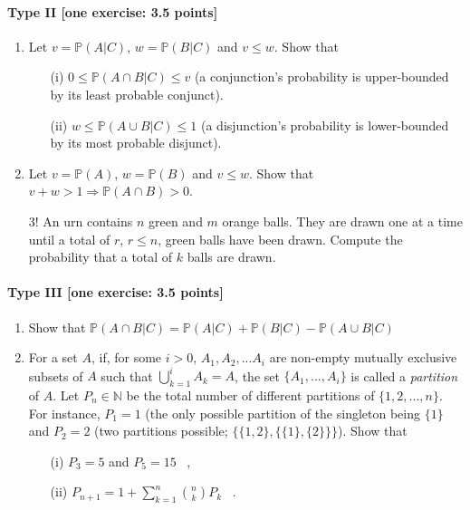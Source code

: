 \documentclass{article}
\begin{document}
\paragraph{Type II [one exercise: 3.5 points]}
\begin{enumerate}
	\item Let $v = \mathbb{P}(A|C)$, $w = \mathbb{P}(B|C)$ and $v \leq w$. Show that 
	\begin{itemize}
		\item [(i)] $0 \leq \mathbb{P}(A \cap B|C) \leq v$ (a conjunction's probability is upper-bounded by its least probable conjunct).	 \item[(ii)] $w \leq \mathbb{P}(A \cup B|C) \leq 1$ (a disjunction's probability is lower-bounded by its most probable disjunct).
	\end{itemize}
\item Let $v = \mathbb{P}(A)$, $w = \mathbb{P}(B)$ and $v \leq w$. Show that $v + w > 1 \Rightarrow \mathbb{P}(A \cap B) > 0$.
\item[3!] An urn contains $n$ green and $m$ orange balls. They are drawn one at a time until a total of $r$, $r \leq n$, green balls have been drawn. Compute the probability that a total of $k$ balls are drawn.

\end{enumerate}



\paragraph{Type III [one exercise: 3.5 points]}
\begin{enumerate}
	\item Show that $\mathbb{P}(A \cap B|C) = \mathbb{P}(A|C) + \mathbb{P}(B|C) - \mathbb{P}(A \cup B|C)$ %
\item For a set $A$, if, for some $i > 0$, $A_1, A_2, ... A_i$ are non-empty mutually exclusive subsets of $A$ such that $\bigcup_{k=1}^{i}A_k = A$, the set $\{A_1, ..., A_i\}$ is called a \emph{partition} of $A$. Let $P_n \in \mathbb{N}$ be the total number of different partitions of $\{1,2,...,n\}$. For instance, $P_1 = 1$ (the only possible partition of the singleton being $\{1\}$ and $P_2 = 2$ (two partitions possible; $\{\{1,2\}, \{\{1\},\{2\}\}\}$). Show that
	\begin{itemize}
		\item[(i)] $P_3 = 5$ and $P_5 = 15$ \, ,
		\item[(ii)] $P_{n+1} = 1 + \sum_{k=1}^n \binom{n}{k}P_k$ \, .
	\end{itemize}

\end{enumerate}
\end{document}
